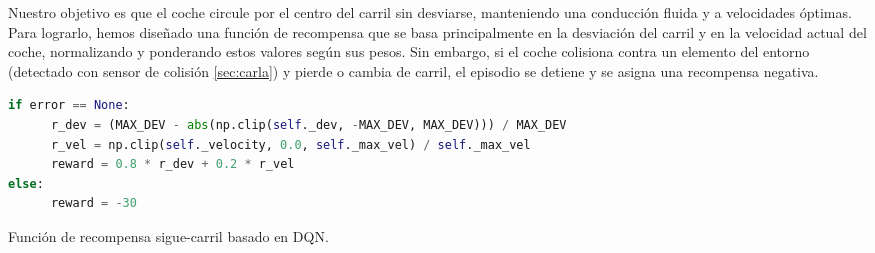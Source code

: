 Nuestro objetivo es que el coche circule por el centro del carril sin desviarse, manteniendo una conducción fluida y a velocidades óptimas. Para lograrlo, hemos diseñado una función de recompensa que se basa principalmente en la desviación del carril y en la velocidad actual del coche, normalizando y ponderando estos valores según sus pesos. Sin embargo, si el coche colisiona contra un elemento del entorno (detectado con sensor de colisión \ref{sec:carla}) y pierde o cambia de carril, el episodio se detiene y se asigna una recompensa negativa.

\begin{code}[h]
\begin{lstlisting}[language=Python]
if error == None:
      r_dev = (MAX_DEV - abs(np.clip(self._dev, -MAX_DEV, MAX_DEV))) / MAX_DEV
      r_vel = np.clip(self._velocity, 0.0, self._max_vel) / self._max_vel
      reward = 0.8 * r_dev + 0.2 * r_vel
else:
      reward = -30
\end{lstlisting}
\caption[Función de recompensa sigue-carril basado en \ac{DQN}]{Función de recompensa sigue-carril basado en \ac{DQN}.}
\label{cod:rew_dqn}
\end{code}

\newpage

